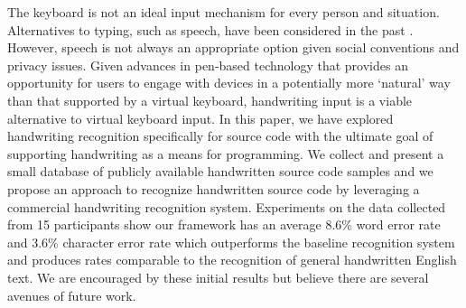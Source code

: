 \documentclass{vgtc}                          %
\begin{document}
 
The keyboard is not an ideal input mechanism for every person and situation.
Alternatives to typing, such as speech, have been considered in the past \cite{desilets2006voicecode, gordon2013improving}. However, speech is not always an appropriate option given social conventions and privacy issues.
Given advances in pen-based technology that provides an opportunity for users to engage with devices in a potentially more `natural' way than that supported by a virtual keyboard, handwriting input is a viable alternative to virtual keyboard input. In this paper, we have explored handwriting recognition specifically for source code with the ultimate goal of supporting handwriting as a means for programming.
We collect and present a small database of publicly available handwritten source code samples and we propose an approach to recognize handwritten source code by leveraging a commercial handwriting recognition system. Experiments on the data collected from 15 participants show our framework has an average 8.6\% word error rate and 3.6\% character error rate which outperforms the baseline recognition system and produces rates comparable to the recognition of general handwritten English text.  We are encouraged by these initial results but believe there are several avenues of future work.


\end{document}
